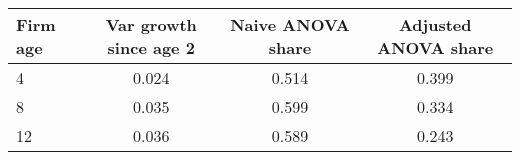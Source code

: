 \begin{tabular}{lccc}
Firm age & Var  growth since age 2 & Naive ANOVA share & Adjusted ANOVA share \\
\hline
4 &     0.024 &  0.514 &  0.399 \\
8 &     0.035 &  0.599 &  0.334 \\
12 &     0.036 &  0.589 &  0.243 \\
\end{tabular}
